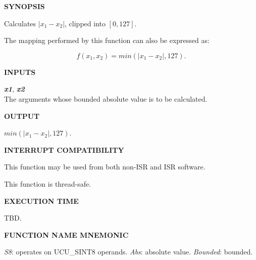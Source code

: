 \noindent\textbf{SYNOPSIS}
\begin{list}{}{\setlength{\leftmargin}{0.25in}\setlength{\topsep}{0.0in}}
\item Calculates $|x_1-x_2|$, clipped into $[0, 127]$.
\item The mapping performed by this function can also be expressed as:

      \begin{equation}
      \label{eq:cbaf0:sscf0:sfss1:01}
      f(x_1, x_2) = min(|x_1 - x_2|, 127) .
      \end{equation}
\end{list}
\vspace{2.8ex}

\noindent\textbf{INPUTS}
\begin{list}{}{\setlength{\leftmargin}{0.5in}\setlength{\itemindent}{-0.25in}\setlength{\topsep}{0.0in}\setlength{\partopsep}{0.0in}}
\item \emph{\textbf{x1}}, \emph{\textbf{x2}}\\
      The arguments whose bounded absolute value is to be calculated.
\end{list}
\vspace{2.8ex}

\noindent\textbf{OUTPUT}
\begin{list}{}{\setlength{\leftmargin}{0.25in}\setlength{\topsep}{0.0in}}
\item $min(|x_1 - x_2|, 127)$.
\end{list}
\vspace{2.8ex}

\noindent\textbf{INTERRUPT COMPATIBILITY}
\begin{list}{}{\setlength{\leftmargin}{0.25in}\setlength{\topsep}{0.0in}}
\item This function may be used from both non-ISR and ISR software.
\item This function is thread-safe.
\end{list}
\vspace{2.8ex}

\noindent\textbf{EXECUTION TIME}
\begin{list}{}{\setlength{\leftmargin}{0.25in}\setlength{\topsep}{0.0in}}
\item TBD.
\end{list}
\vspace{2.8ex}

\noindent\textbf{FUNCTION NAME MNEMONIC}
\begin{list}{}{\setlength{\leftmargin}{0.25in}\setlength{\topsep}{0.0in}}
\item \emph{S8}:        operates on UCU\_SINT8 operands.
      \emph{Abs}:       absolute value.
      \emph{Bounded}:   bounded.
\end{list}


